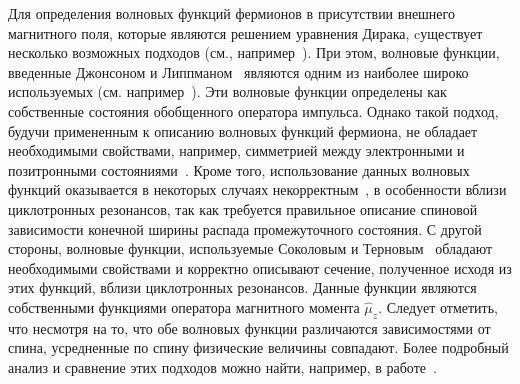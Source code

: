 Для определения волновых функций фермионов в присутствии внешнего магнитного поля, которые являются решением уравнения Дирака, cуществует  несколько возможных подходов  (см., 
например~\cite{Johnson:1949,Akhiezer:1965,Sokolov:1968,Melrose:1983a,Sokolov:1986,KM_Book_2003,Bhattacharya:2004,Balantsev:2011,KM_Book_2013}).
При этом, волновые функции, введенные Джонсоном и Липпманом~\cite{Johnson:1949} являются одним из наиболее широко используемых (см. например~\cite{Canuto:1975,Harding:1991,Suh:1999,Gonthier:2000,Jones:2010,Melrose:2020}). 
Эти волновые функции определены как собственные состояния обобщенного оператора импульса. Однако такой подход, будучи примененным к описанию волновых функций фермиона, не обладает необходимыми свойствами, например, симметрией между электронными и позитронными состояниями~\cite{Melrose:1983}. Кроме того, использование данных волновых функций оказывается в некоторых случаях некорректным~\cite{Graziani:1993,Gonthier:2014}, в особенности вблизи циклотронных резонансов, так как требуется правильное описание спиновой зависимости конечной ширины распада промежуточного состояния. 
С другой стороны, волновые функции, используемые Соколовым и Терновым~\cite{Sokolov:1986} обладают необходимыми свойствами и корректно описывают сечение, полученное исходя из этих функций, вблизи циклотронных резонансов. Данные функции являются собственными функциями оператора магнитного момента $\hat{\mu}_z$. Следует отметить, что несмотря на то, что обе волновых функции различаются зависимостями от спина, усредненные по спину физические величины совпадают. Более подробный анализ и сравнение этих подходов можно найти, например, в работе~\cite{Gonthier:2014}. 